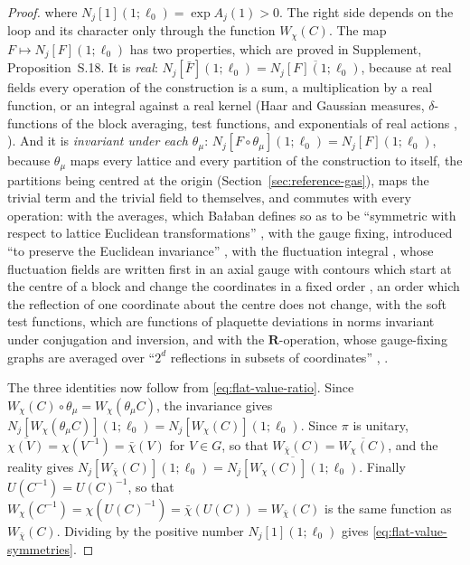 \documentclass[11pt]{preprint}
\numberwithin{equation}{section}
\theoremstyle{definition}
\theoremstyle{remark}
\theoremstyle{plain}
\begin{document}
\begin{proof}
where $N_j[1](1; \ell_0) = \exp A_j(1) > 0$. The right side depends on the loop and its character only through the function $W_\chi(C)$. The map $F \mapsto N_j[F](1; \ell_0)$ has two properties, which are proved in Supplement, Proposition~S.18. It is \emph{real}: $N_j[\bar F](1; \ell_0) = \overline{N_j[F](1; \ell_0)}$, because at real fields every operation of the construction is a sum, a multiplication by a real function, or an integral against a real kernel (Haar and Gaussian measures, $\delta$-functions of the block averaging, test functions, and exponentials of real actions \cite[(3.27), p.~271]{BalabanCRE}, \cite[p.~380]{BalabanLFR2}). And it is \emph{invariant under each $\theta_\mu$}: $N_j[F \circ \theta_\mu](1; \ell_0) = N_j[F](1; \ell_0)$, because $\theta_\mu$ maps every lattice and every partition of the construction to itself, the partitions being centred at the origin (Section~\ref{sec:reference-gas}), maps the trivial term and the trivial field to themselves, and commutes with every operation: with the averages, which Ba{\l}aban defines so as to be ``symmetric with respect to lattice Euclidean transformations'' \cite[p.~252]{BalabanRG1}, with the gauge fixing, introduced ``to preserve the Euclidean invariance'' \cite[p.~247]{BalabanCRE}, with the fluctuation integral \cite[(2.17), (2.18), p.~269]{BalabanRG1}, whose fluctuation fields are written first in an axial gauge \cite[(1.19), p.~79]{BalabanREG} with contours which start at the centre of a block and change the coordinates in a fixed order \cite[(1.7), p.~18]{BalabanPRT1}, an order which the reflection of one coordinate about the centre does not change, with the soft test functions, which are functions of plaquette deviations in norms invariant under conjugation and inversion, and with the $\mathbf R$-operation, whose gauge-fixing graphs are averaged over ``$2^d$ reflections in subsets of coordinates'' \cite[(1.100), p.~201]{BalabanLFR1}, \cite[p.~379]{BalabanLFR2}.

The three identities now follow from \eqref{eq:flat-value-ratio}. Since $W_\chi(C) \circ \theta_\mu = W_\chi(\theta_\mu C)$, the invariance gives $N_j[W_\chi(\theta_\mu C)](1; \ell_0) = N_j[W_\chi(C)](1; \ell_0)$. Since $\pi$ is unitary, $\overline{\chi(V)} = \chi(V^{-1}) = \bar\chi(V)$ for $V \in G$, so that $W_{\bar\chi}(C) = \overline{W_\chi(C)}$, and the reality gives $N_j[W_{\bar\chi}(C)](1; \ell_0) = \overline{N_j[W_\chi(C)](1; \ell_0)}$. Finally $U(C^{-1}) = U(C)^{-1}$, so that $W_\chi(C^{-1}) = \chi(U(C)^{-1}) = \bar\chi(U(C)) = W_{\bar\chi}(C)$ is the same function as $W_{\bar\chi}(C)$. Dividing by the positive number $N_j[1](1; \ell_0)$ gives \eqref{eq:flat-value-symmetries}.
\end{proof}
\end{document}
